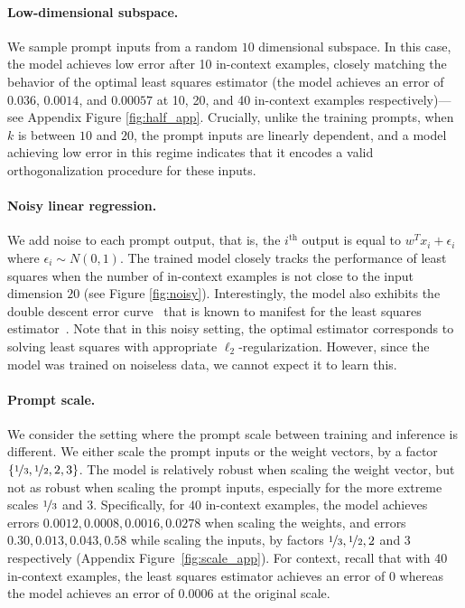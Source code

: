 \documentclass{article}
\begin{document}
\paragraph{Low-dimensional subspace.} We sample prompt inputs from a random $10$ dimensional subspace. 
In this case, the model achieves low error after 10 in-context examples,  closely matching the behavior of the optimal least squares estimator (the model achieves an error of $0.036$, $0.0014$, and $0.00057$ at 10, 20, and 40 in-context examples respectively)---see Appendix Figure \ref{fig:half_app}.
Crucially, unlike the training prompts, when $k$ is between $10$ and $20$, the prompt inputs are linearly dependent, and a model  achieving low error in this regime indicates that it encodes a valid orthogonalization procedure for these inputs.

\paragraph{Noisy linear regression.} We add noise to each prompt output, that is, the $i^{\text{th}}$ output is equal to $w^T x_i + \epsilon_i$ where $\epsilon_i \sim N(0, 1)$.
The trained model closely tracks the performance of least squares when the number of in-context examples is not close to the input dimension $20$ (see Figure \ref{fig:noisy}). 
Interestingly, the model also exhibits the double descent error curve~\citep{belkin2019reconciling}  that is known to manifest for the least squares estimator~\citep{nakkiran2019more}.
Note that in this noisy setting, the optimal estimator corresponds to solving least squares with appropriate $\ell_2$-regularization. However, since the model was trained on noiseless data, we cannot expect it to learn this.

\paragraph{Prompt scale.} We consider the setting where the prompt scale between training and inference is different. We either scale the prompt inputs or the weight vectors, by a factor $\{\nicefrac{1}{3}, \nicefrac{1}{2},  2, 3\}$.
The model is relatively robust when scaling the weight vector, but not as robust when scaling the prompt inputs, especially for the more extreme scales $\nicefrac{1}{3}$ and $3$.
Specifically, for $40$ in-context examples, the model achieves errors $0.0012,0.0008,0.0016,0.0278$ when scaling the weights, and errors $0.30,0.013,0.043,0.58$ while scaling the inputs, by factors $\nicefrac{1}{3}, \nicefrac{1}{2},  2$ and $3$ respectively (Appendix Figure~\ref{fig:scale_app}). For context, recall that with 40 in-context examples, the least squares  estimator achieves an error of $0$ whereas the model achieves an error of $0.0006$ at the original scale.
\end{document}
